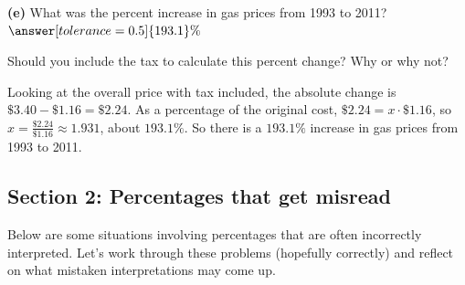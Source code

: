 \documentclass[12pt]{ximera}
\begin{document}
\begin{problem}
\begin{prompt}
\textbf{(e)} What was the percent increase in gas prices from 1993 to 2011?
$\answer[tolerance=0.5]{193.1}\%$

Should you include the tax to calculate this percent change? Why or why not?
\begin{freeResponse}
\end{freeResponse}

\begin{solution}
Looking at the overall price with tax included, the absolute change is
$\$3.40 - \$1.16 = \$2.24$. As a percentage of the original cost,
$\$2.24 = x \cdot \$1.16$, so $x = \frac{\$2.24}{\$1.16} \approx 1.931$, about
$193.1\%$. So there is a $193.1\%$ increase in gas prices from 1993 to 2011.
\end{solution}
\end{prompt}
\end{problem}

\subsection*{Section 2: Percentages that get misread}

Below are some situations involving percentages that are often incorrectly
interpreted. Let's work through these problems (hopefully correctly) and reflect on
what mistaken interpretations may come up.
\end{document}
